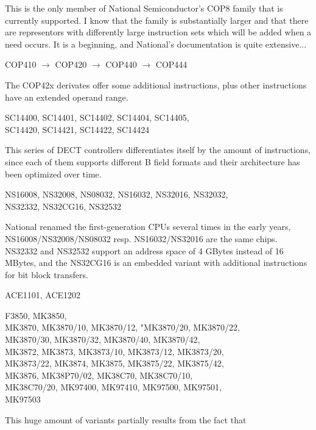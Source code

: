 \documentclass[12pt,twoside]{report}
\begin{document}
This is the only member of National Semiconductor's COP8 family that
is currently supported.  I know that the family is substantially
larger and that there are representors with differently large
instruction sets which will be added when a need occurs.  It is a
beginning, and National's documentation is quite extensive...
\begin{cpulist}
   COP410 $\rightarrow$ COP420 $\rightarrow$ COP440 $\rightarrow$ COP444
\end{cpulist}
The COP42x derivates offer some additional instructions, plus other
instructions have an extended operand range.
\begin{cpulist}
   SC14400, SC14401, SC14402, SC14404, SC14405, \\
\> SC14420, SC14421, SC14422, SC14424
\end{cpulist}
This series of DECT controllers differentiates itself by the amount of
instructions, since each of them supports different B field formats and
their architecture has been optimized over time.
\begin{cpulist}
   NS16008, NS32008, NS08032, NS16032, NS32016, NS32032, \\
\> NS32332, NS32CG16, NS32532
\end{cpulist}
National renamed the first-generation CPUs several times in the early
years, NS16008/NS32008/NS08032 resp. NS16032/NS32016 are the same chips.
NS32332 and NS32532 support an address space of  4 GBytes instead of 16
MBytes, and the NS32CG16 is an embedded variant with additional instructions
for bit block transfers.
\begin{cpulist}
   ACE1101, ACE1202
\end{cpulist}
\begin{cpulist}
   F3850, MK3850, \\
\> MK3870, MK3870/10, MK3870/12, "MK3870/20, MK3870/22, \\
\> MK3870/30, MK3870/32, MK3870/40, MK3870/42, \\
\> MK3872, MK3873, MK3873/10, MK3873/12, MK3873/20, \\
\> MK3873/22, MK3874, MK3875, MK3875/22, MK3875/42, \\
\> MK3876, MK38P70/02, MK38C70, MK38C70/10, \\
\> MK38C70/20, MK97400, MK97410, MK97500, MK97501, \\
\> MK97503
\end{cpulist}
This huge amount of variants partially results from the fact that
\end{document}
